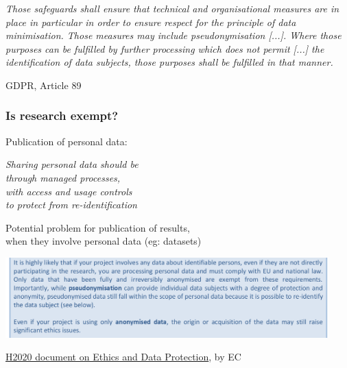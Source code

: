 \documentclass[17pt,aspectratio=169,hyperref={pdfusetitle,colorlinks,allcolors=olive}]{beamer}
\begin{document}
\begin{frame}[fragile]
\vspace{-.3cm}
  {\small \em
    Those safeguards shall ensure that technical and organisational measures are in place in particular in order to ensure respect for the principle of data minimisation. Those measures may include pseudonymisation [...]. Where those purposes can be fulfilled by further processing which
does not permit [...] the identification of data subjects, those purposes shall be fulfilled in that manner.
  }

  \begin{flushright}
    GDPR, Article 89
  \end{flushright}
\end{frame}

\begin{frame}[fragile]
  \frametitle{Is research exempt?}

  Publication of personal data: \\
  \vspace{.2cm}

  {\em
    Sharing personal data should be \\
    through managed processes, \\
    with access and usage controls \\
    to protect from re-identification
  }
  \vspace{.2cm}
  \begin{flushright}
    Potential problem for publication of results, \\
    when they involve personal data (eg: datasets) \\
  \end{flushright}
\end{frame}


\begin{frame}[fragile]

  \begin{center}
  \includegraphics[width=12.5cm]{figs/gdpr-anon-pseudoanon}
  \end{center}
  
  {\footnotesize
    \begin{flushright}
    \href{https://ec.europa.eu/research/participants/data/ref/h2020/grants_manual/hi/ethics/h2020_hi_ethics-data-protection_en.pdf}{H2020 document on Ethics and Data Protection},  by EC
  \end{flushright}
  }
  
\end{frame}
\end{document}
